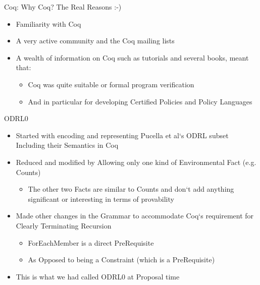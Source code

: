 \documentclass{beamer}
\begin{document}
\begin{frame}[fragile]{Coq: Why Coq? The Real Reasons :-)}
\Large
\begin{itemize}
\item Familiarity with Coq 
\item A very active community and the Coq mailing lists
\item A wealth of information on Coq such as tutorials and several books, meant that:
   \begin{itemize}
       \item Coq was quite suitable or formal program verification
       \item And in particular for developing Certified Policies and Policy Languages
   \end{itemize}
\end{itemize}
\end{frame}
\begin{frame}[fragile]{ODRL0}
\begin{itemize}
\item Started with encoding and representing Pucella et al`s ODRL subset Including their Semantics in Coq
\item Reduced and modified by Allowing only one kind of Environmental Fact (e.g. Counts)
   \begin{itemize}
      \item The other two Facts are similar to Counts and don`t add anything significant or interesting in terms of provability 
   \end{itemize}
\item Made other changes in the Grammar to accommodate Coq`s requirement for Clearly Terminating Recursion
    \begin{itemize}
        \item ForEachMember is a direct PreRequisite
        \item As Opposed to being a Constraint (which is a PreRequisite)
    \end{itemize}
\item This is what we had called ODRL0 at Proposal time
\end{itemize}
\end{frame}
\end{document}
